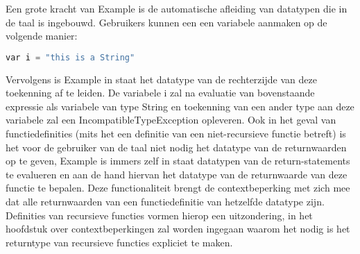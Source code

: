 Een grote kracht van Example is de automatische afleiding van datatypen die in de taal is ingebouwd. Gebruikers kunnen een een variabele aanmaken op de volgende manier:\\ 
\begin{lstlisting}[language=Python]
var i = "this is a String"
\end{lstlisting}
Vervolgens is Example in staat het datatype van de rechterzijde van deze toekenning af te leiden. De variabele i zal na evaluatie van bovenstaande expressie als variabele van type String en toekenning van een ander type aan deze variabele zal een IncompatibleTypeException opleveren. Ook in het geval van functiedefinities (mits het een definitie van een niet-recursieve functie betreft) is het voor de gebruiker van de taal niet nodig het datatype van de returnwaarden op te geven, Example is immers zelf in staat datatypen van de return-statements te evalueren en aan de hand hiervan het datatype van de returnwaarde van deze functie te bepalen. Deze functionaliteit brengt de contextbeperking met zich mee dat alle returnwaarden van een functiedefinitie van hetzelfde datatype zijn. Definities van recursieve functies vormen hierop een uitzondering, in het hoofdstuk over contextbeperkingen zal worden ingegaan waarom het nodig is het returntype van recursieve functies expliciet te maken.
